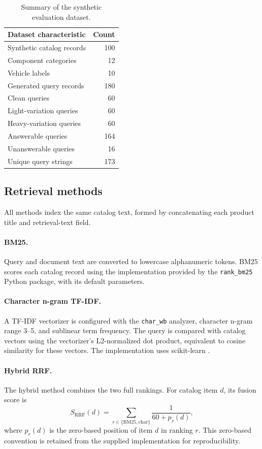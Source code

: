 \documentclass[11pt,a4paper]{article}
\begin{document}
\begin{table}[htbp]
\centering
\caption{Summary of the synthetic evaluation dataset.}
\label{tab:dataset}
\begin{tabular}{lr}
\toprule
\textbf{Dataset characteristic} & \textbf{Count} \\
\midrule
Synthetic catalog records & 100 \\
Component categories & 12 \\
Vehicle labels & 10 \\
Generated query records & 180 \\
Clean queries & 60 \\
Light-variation queries & 60 \\
Heavy-variation queries & 60 \\
Answerable queries & 164 \\
Unanswerable queries & 16 \\
Unique query strings & 173 \\
\bottomrule
\end{tabular}
\end{table}

\subsection{Retrieval methods}
All methods index the same catalog text, formed by concatenating each product title and retrieval-text field.

\paragraph{BM25.} Query and document text are converted to lowercase alphanumeric tokens. BM25 scores each catalog record using the implementation provided by the \texttt{rank\_bm25} Python package, with its default parameters.

\paragraph{Character n-gram TF-IDF.} A TF-IDF vectorizer is configured with the \texttt{char\_wb} analyzer, character n-gram range 3--5, and sublinear term frequency. The query is compared with catalog vectors using the vectorizer's L2-normalized dot product, equivalent to cosine similarity for these vectors. The implementation uses scikit-learn \citep{pedregosa2011sklearn}.

\paragraph{Hybrid RRF.} The hybrid method combines the two full rankings. For catalog item $d$, its fusion score is
\begin{equation}
S_{\mathrm{RRF}}(d)=\sum_{r\in\{\mathrm{BM25},\mathrm{char}\}}\frac{1}{60+p_r(d)},
\label{eq:rrf}
\end{equation}
where $p_r(d)$ is the zero-based position of item $d$ in ranking $r$. This zero-based convention is retained from the supplied implementation for reproducibility.
\end{document}
